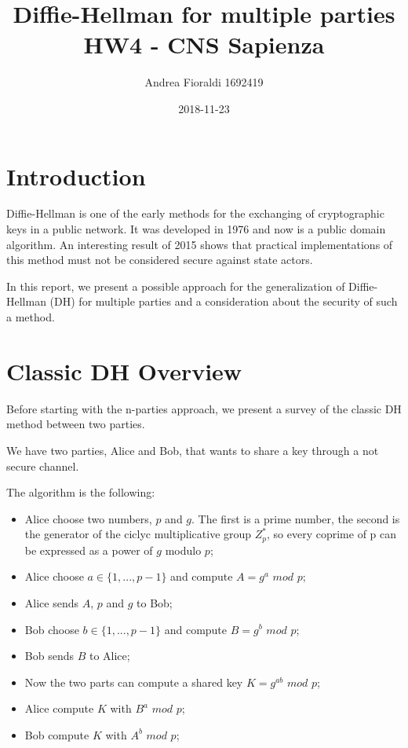 \documentclass[11pt]{article}
\title{{\bf Diffie-Hellman for multiple parties} \\ \bigskip \large HW4 - CNS Sapienza}
\date{2018-11-23}
\author{Andrea Fioraldi 1692419}
\begin{document}
\maketitle

\section{Introduction}

Diffie-Hellman is one of the early methods for the exchanging of cryptographic keys in a public network. It was developed in 1976 \cite{Diffie1976} and now is a public domain algorithm.
An interesting result of 2015 \cite{Adrian2015a} shows that practical implementations of this method must not be considered secure against state actors.

In this report, we present a possible approach for the generalization of Diffie-Hellman (DH) for multiple parties and a consideration about the security of such a method.

\section{Classic DH Overview}

Before starting with the n-parties approach, we present a survey of the classic DH method between two parties.

We have two parties, Alice and Bob, that wants to share a key through a not secure channel.

The algorithm is the following:

\begin{itemize}
    \item Alice choose two numbers, $p$ and $g$. The first is a prime number, the second is the generator of the ciclyc multiplicative group $Z^*_p$, so every coprime of p can be expressed as a power of $g$ modulo $p$;
    \item Alice choose $a \in \{1, ..., p-1\}$ and compute $A = g^a$ $mod$ $p$;
    \item Alice sends $A$, $p$ and $g$ to Bob;
    \item Bob choose $b \in \{1, ..., p-1\}$ and compute $B = g^b$ $mod$ $p$;
    \item Bob sends $B$ to Alice;
    \item Now the two parts can compute a shared key $K = g^{ab}$ $mod$ $p$;
    \item Alice compute $K$ with $B^a$ $mod$ $p$;
    \item Bob compute $K$ with $A^b$ $mod$ $p$;
\end{itemize} 
\end{document}
